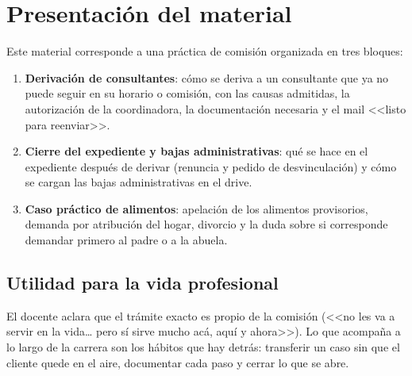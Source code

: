 \documentclass[12pt,oneside]{book}
\begin{document}
\frontmatter
\tableofcontents
\mainmatter

\chapter*{Presentación del material}

Este material corresponde a una práctica de comisión organizada en tres bloques:

\begin{enumerate}
    \item \textbf{Derivación de consultantes}: cómo se deriva a un consultante que ya no puede seguir en su horario o comisión, con las causas admitidas, la autorización de la coordinadora, la documentación necesaria y el mail <<listo para reenviar>>.
    \item \textbf{Cierre del expediente y bajas administrativas}: qué se hace en el expediente después de derivar (renuncia y pedido de desvinculación) y cómo se cargan las bajas administrativas en el drive.
    \item \textbf{Caso práctico de alimentos}: apelación de los alimentos provisorios, demanda por atribución del hogar, divorcio y la duda sobre si corresponde demandar primero al padre o a la abuela.
\end{enumerate}

\section*{Utilidad para la vida profesional}

El docente aclara que el trámite exacto es propio de la comisión (<<no les va a servir en la vida\ldots{} pero sí sirve mucho acá, aquí y ahora>>). Lo que acompaña a lo largo de la carrera son los hábitos que hay detrás: transferir un caso sin que el cliente quede en el aire, documentar cada paso y cerrar lo que se abre.
\end{document}
